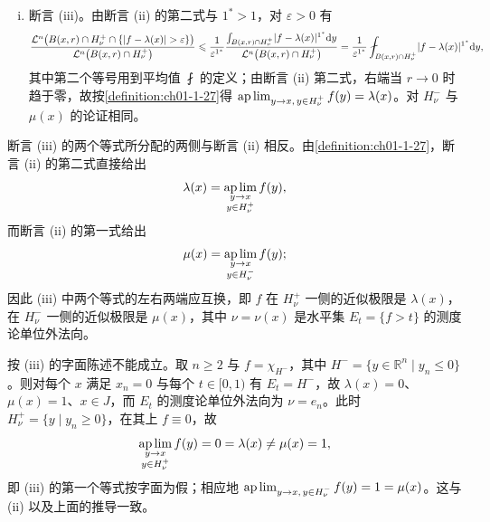 \documentclass[../../main.tex]{subfiles}%
\begin{document}
\begin{remark}
\begin{enumerate}[(i)]
\item 断言 (iii)。由断言 (ii) 的第二式与 $1^{*}>1$，对 $\varepsilon>0$ 有
\begin{align*}
\frac{\mathcal{L}^n\bigl(B(x,r)\cap H_\nu^+\cap\{\lvert f-\lambda(x)\rvert>\varepsilon\}\bigr)}{\mathcal{L}^n\bigl(B(x,r)\cap H_\nu^+\bigr)}
\leqslant\frac{1}{\varepsilon^{1^{*}}}\frac{\int_{B(x,r)\cap H_\nu^+}\lvert f-\lambda(x)\rvert^{1^{*}}\diff y}{\mathcal{L}^n\bigl(B(x,r)\cap H_\nu^+\bigr)}
=\frac{1}{\varepsilon^{1^{*}}}\fint_{B(x,r)\cap H_\nu^+}\lvert f-\lambda(x)\rvert^{1^{*}}\diff y ,
\end{align*}
其中第二个等号用到平均值 $\fint$ 的定义；由断言 (ii) 第二式，右端当 $r\to0$ 时趋于零，故按\cref{definition:ch01-1-27}得 $\operatorname*{ap\,lim}_{y\to x,\,y\in H_\nu^+}f(y)=\lambda(x)$。对 $H_\nu^-$ 与 $\mu(x)$ 的论证相同。%
\end{enumerate}
\end{remark}

\begin{remark}\label{remark:ch05-thm-5-19-取向}
断言 (iii) 的两个等式所分配的两侧与断言 (ii) 相反。由\cref{definition:ch01-1-27}，断言 (ii) 的第二式直接给出 %
\begin{align*}
\lambda(x)=\operatorname*{ap\,lim}_{\substack{y\to x\\ y\in H_\nu^+}}f(y),
\end{align*}
而断言 (ii) 的第一式给出
\begin{align*}
\mu(x)=\operatorname*{ap\,lim}_{\substack{y\to x\\ y\in H_\nu^-}}f(y) ;
\end{align*}
因此 (iii) 中两个等式的左右两端应互换，即 $f$ 在 $H_\nu^+$ 一侧的近似极限是 $\lambda(x)$，在 $H_\nu^-$ 一侧的近似极限是 $\mu(x)$，其中 $\nu=\nu(x)$ 是水平集 $E_t=\{f>t\}$ 的测度论单位外法向。

按 (iii) 的字面陈述不能成立。取 $n\geqslant2$ 与 $f=\chi_{H^-}$，其中 $H^-=\{y\in\mathbb{R}^n\mid y_n\leqslant0\}$。则对每个 $x$ 满足 $x_n=0$ 与每个 $t\in[0,1)$ 有 $E_t=H^-$，故 $\lambda(x)=0$、$\mu(x)=1$、$x\in J$，而 $E_t$ 的测度论单位外法向为 $\nu=e_n$。此时 $H_\nu^+=\{y\mid y_n\geqslant0\}$，在其上 $f\equiv0$，故
\begin{align*}
\operatorname*{ap\,lim}_{\substack{y\to x\\ y\in H_\nu^+}}f(y)=0=\lambda(x)\neq\mu(x)=1 ,
\end{align*}
即 (iii) 的第一个等式按字面为假；相应地 $\operatorname*{ap\,lim}_{y\to x,\,y\in H_\nu^-}f(y)=1=\mu(x)$。这与 (ii) 以及上面的推导一致。
\end{remark}
\end{document}
